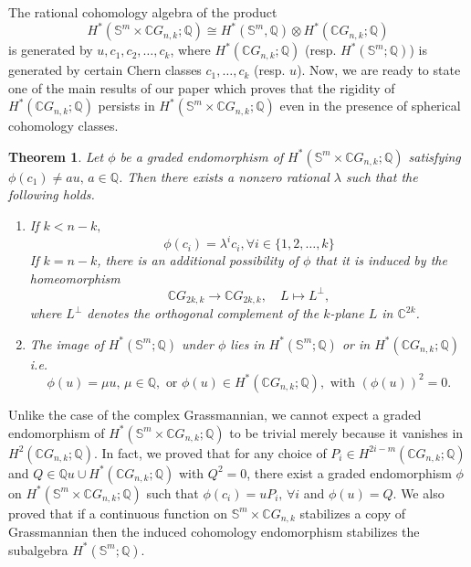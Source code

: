 \documentclass{amsart}
\newtheorem{theorem}{Theorem}[section]
\begin{document}
	The rational cohomology algebra of the product
	\[
	H^*(\mathbb S^m \times \mathbb CG_{n,k};\mathbb Q)\cong H^*(\mathbb S^m,\mathbb Q)\otimes H^*(\mathbb CG_{n,k};\mathbb Q)
	\]
	is generated by $u,c_1,c_2,\dots,c_k$, where $H^*(\mathbb{C}G_{n,k};\mathbb{Q})$ (resp. $H^*(\mathbb S^m;\mathbb Q)$) is generated by certain Chern classes $c_1, \dots, c_k$ (resp. $u$). Now, we are ready to state one of the main results of our paper which proves that the rigidity of $H^*(\mathbb CG_{n,k};\mathbb Q)$ persists in $H^*(\mathbb S^m \times \mathbb CG_{n,k};\mathbb Q)$ even in the presence of spherical cohomology classes.
	\begin{theorem}
		Let $\phi$ be a graded endomorphism of 
		$H^*(\mathbb S^{m}\times\mathbb C G_{n,k};\mathbb Q)$ 
		satisfying $\phi(c_1)\neq a u, \, a\in\mathbb Q$.  
		Then there exists a nonzero rational $\lambda$ such that the following holds.
		\begin{enumerate}\label{result main}
			\item If $k < n - k,$ 
			$$ \phi(c_i) = \lambda^i c_i, \forall i \in \{1,2,\dots,k\}$$
			If $k = n - k$, there is an additional possibility of $\phi$ that it is induced by the homeomorphism 
			\[
			\mathbb{C}G_{2k,k} \longrightarrow \mathbb{C}G_{2k,k}, 
			\quad L \longmapsto L^{\perp},
			\]
			where $L^{\perp}$ denotes the orthogonal complement of the $k$-plane $L$ in $\mathbb{C}^{2k}$.
			
			\item 
			The image of $H^*(\mathbb{S}^m;\mathbb{Q})$ under $\phi$ lies in 
			$H^*(\mathbb{S}^m;\mathbb{Q})$ or in $H^*(\mathbb{C}G_{n,k};\mathbb{Q})$ i.e. $$\phi(u) = \mu u,\, \mu \in \mathbb{Q}, \text{ or } \phi(u) \in H^*(\mathbb{C}G_{n,k};\mathbb{Q}), \text{ with } (\phi(u))^2 =0.$$
			
		\end{enumerate}
	\end{theorem}
	Unlike the case of the complex Grassmannian, we cannot expect a graded
	endomorphism of $H^*(\mathbb S^m \times \mathbb CG_{n,k};\mathbb Q)$ to be
	trivial merely because it vanishes in $H^2(\mathbb{C}G_{n,k}; \mathbb{Q})$. 
	In fact, we proved that for any choice of $P_i \in H^{2i-m}(\mathbb{C}G_{n,k};\mathbb{Q})$ and $Q\in \mathbb Qu\cup  H^*(\mathbb CG_{n,k};\mathbb Q)$ with $Q^2=0$, there exist a graded endomorphism $\phi$ on $H^*(\mathbb S^m \times \mathbb CG_{n,k};\mathbb Q)$ such that $\phi(c_i) = uP_i, \, \forall i$ and $\phi(u)=Q$.
	We also proved that if a continuous function on $\mathbb S^m \times \mathbb CG_{n,k}$ stabilizes a copy of Grassmannian then the induced cohomology endomorphism stabilizes the subalgebra $H^*(\mathbb S^m ;\mathbb Q)$.
	
\end{document}

